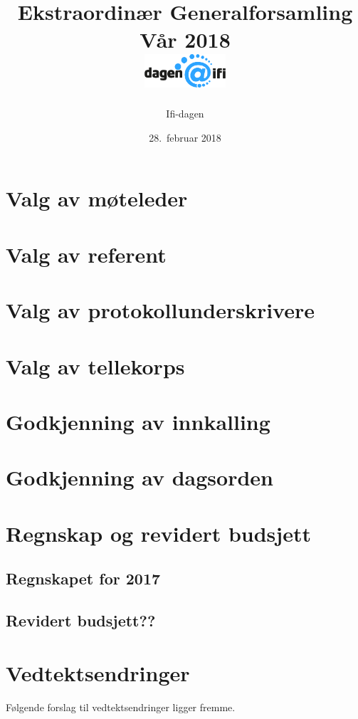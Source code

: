 \documentclass[10pt,norsk,a4paper]{article}
\title{Ekstraordinær Generalforsamling \\
	Vår 2018\\[3cm]
	\includegraphics[width=3cm,trim=0 4cm 0 0]{../res/logo.png}\\}
\date{28.\ februar 2018}
\author{Ifi-dagen}
\begin{document}
\maketitle{}
\newpage
\tableofcontents{}
\newpage


\section{Valg av møteleder}

\section{Valg av referent}

\section{Valg av protokollunderskrivere}

\section{Valg av tellekorps}

\section{Godkjenning av innkalling}

\section{Godkjenning av dagsorden}

\section{Regnskap og revidert budsjett}
\subsection{Regnskapet for 2017}

\subsection{Revidert budsjett??}

\section{Vedtektsendringer}
Følgende forslag til vedtektsendringer ligger fremme.
\end{document}
